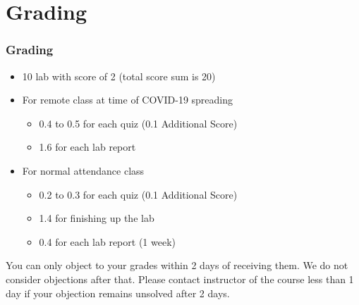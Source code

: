 \documentclass[aspectratio=169,15pt]{beamer}
\begin{document}
\section{Grading}
\begin{frame}
    \frametitle{Grading}

    \begin{itemize}
        \item 10 lab with score of \alert{2} (total score sum is \alert{20})
        \item For remote class at time of \alert{COVID-19} spreading
        \begin{itemize}
            \item {\color{red} 0.4} to {\color{red} 0.5} for each quiz (0.1 Additional Score)
            \item {\color{red} 1.6} for each lab report
        \end{itemize}
        \item For normal attendance class
        \begin{itemize}
            \item {\color{red} 0.2} to {\color{red} 0.3} for each quiz (0.1 Additional Score)
            \item {\color{red} 1.4} for finishing up the lab
            \item {\color{red} 0.4} for each lab report (1 week)
        \end{itemize}
    \end{itemize}
    \begin{alertblock}{}
        You can only object to your grades within {\color{red} 2 days} of receiving them.
        We do not consider objections after that.
        Please contact instructor of the course less than 1 day if your objection remains unsolved after 2 days.
    \end{alertblock}

\end{frame}
\end{document}
